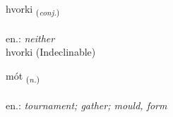 \documentclass[frontgrid, backgrid]{flacards}\usepackage[]{graphicx}\usepackage[]{xcolor}
\begin{document}
\renewcommand{\blhead}{\vskip5pt {\small\bfseries\footnotesize Samtenging | Conjuction }}
\renewcommand{\bcfoot}{\vskip5pt \hspace{2pt}{\small\bfseries\footnotesize 1K}}


{hvorki \small{\textsubscript{(\textit{conj.})}} \\[1ex]
\textphonetic{[kʰvɔr̥cɪ]} \\
en.: \emph{neither} \\  [2ex]
hvorki (Indeclinable)}

\renewcommand{\flhead}{\vskip5pt \fboxsep=0pt {\small\bfseries\footnotesize Nafnorð | Noun}}
\renewcommand{\fcfoot}{\vskip5pt \fboxsep=0pt \hspace{2pt}{\small\bfseries\footnotesize 1K}}

\renewcommand{\blhead}{\vskip5pt {\small\bfseries\footnotesize Nafnorð | Noun }}
\renewcommand{\bcfoot}{\vskip5pt \hspace{2pt}{\small\bfseries\footnotesize 1K}}


{mót \small{\textsubscript{(\textit{n.})}} \\[1ex] %
\textphonetic{[mouːt]} \\
en.: \emph{tournament; gather; mould, form} \\  [2ex]
\renewcommand*{\arraystretch}{0.8}
}

\renewcommand{\flhead}{\vskip5pt \fboxsep=0pt {\small\bfseries\footnotesize Nafnorð | Noun}}
\renewcommand{\fcfoot}{\vskip5pt \fboxsep=0pt \hspace{2pt}{\small\bfseries\footnotesize 1K}}

\renewcommand{\blhead}{\vskip5pt {\small\bfseries\footnotesize Nafnorð | Noun }}
\renewcommand{\bcfoot}{\vskip5pt \hspace{2pt}{\small\bfseries\footnotesize 1K}}
\end{document}
